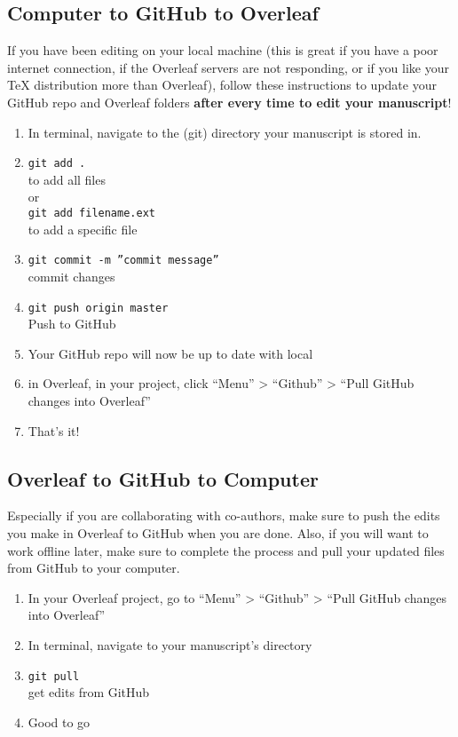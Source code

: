 \documentclass[10pt]{article}
\begin{document}
\subsection{Computer to GitHub to Overleaf}
If you have been editing on your local machine (this is great if you have a poor internet connection, if the Overleaf servers are not responding, or if you like your TeX distribution more than Overleaf), follow these instructions to update your GitHub repo and Overleaf folders \textbf{after every time to edit your manuscript}!
\begin{enumerate}
\item In terminal, navigate to the (git) directory your manuscript is stored in.
\item \texttt{git add .}\\to add all files\\or\\ \texttt{git add filename.ext} \\ to add a specific file
\item \texttt{git commit -m ''commit message''} \\commit changes
\item \texttt{git push origin master}\\Push to GitHub
\item Your GitHub repo will now be up to date with local
\item in Overleaf, in your project, click ``Menu'' > ``Github'' > ``Pull GitHub changes into Overleaf''
\item That's it!
\end{enumerate}

\subsection{Overleaf to GitHub to Computer}
Especially if you are collaborating with co-authors, make sure to push the edits you make in Overleaf to GitHub when you are done. Also, if you will want to work offline later, make sure to complete the process and pull your updated files from GitHub to your computer.
\begin{enumerate}
\item In your Overleaf project, go to ``Menu'' >  ``Github'' > ``Pull GitHub changes into Overleaf''
\item In terminal, navigate to your manuscript's directory
\item \texttt{git pull}\\get edits from GitHub
\item Good to go
\end{enumerate}
\end{document}
